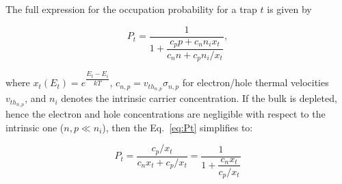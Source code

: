
The full expression for the occupation probability for a trap $t$ is given by~\cite{LUTZ1996}

\begin{equation}
  P_t=\dfrac{1}{1+\dfrac{c_pp+c_nn_ix_t}{c_nn+c_pn_i/x_t}},
  \label{eq:Pt}
\end{equation}


\noindent where $x_t(E_t)=e^{\dfrac{E_t-E_i}{kT}}$, $c_{n,p}=v_{th_{n,p}}\sigma_{n,p}$ for electron/hole thermal velocities $v_{th_{n,p}}$, and $n_i$ denotes the intrinsic carrier concentration.  If the bulk is depleted, hence the electron and hole concentrations are negligible with respect to the intrinsic one ($n,p\ll n_i$), then the Eq.~\ref{eq:Pt} simplifies to:

\begin{equation}
P_t=\dfrac{c_p/x_t}{c_nx_t+c_p/x_t}=\dfrac{1}{1+\dfrac{c_nx_t}{c_p/x_t}}
\label{eq:simplePt}
\end{equation}



